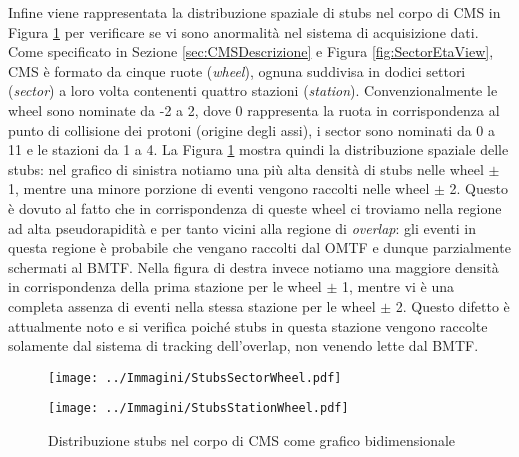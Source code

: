   Infine viene rappresentata la distribuzione spaziale di stubs nel corpo di CMS in Figura \ref{fig:StubsInCMS} per verificare se vi sono anormalità nel sistema di acquisizione dati. Come specificato in Sezione \ref{sec:CMSDescrizione} e Figura \ref{fig:SectorEtaView}, CMS è formato da cinque ruote (\textit{wheel}), ognuna suddivisa in dodici settori (\textit{sector}) a loro volta contenenti quattro stazioni (\textit{station}). Convenzionalmente le wheel sono nominate da -2 a 2, dove 0 rappresenta la ruota in corrispondenza al punto di collisione dei protoni (origine degli assi), i sector sono nominati da 0 a 11 e le stazioni da 1 a 4. La Figura \ref{fig:StubsInCMS} mostra quindi la distribuzione spaziale delle stubs: nel grafico di sinistra notiamo una più alta densità di stubs nelle wheel $\pm$ 1, mentre una minore porzione di eventi vengono raccolti nelle wheel $\pm$ 2. Questo è dovuto al fatto che in corrispondenza di queste wheel ci troviamo nella regione ad alta pseudorapidità e per tanto vicini alla regione di \textit{overlap}: gli eventi in questa regione è probabile che vengano raccolti dal OMTF e dunque parzialmente schermati al BMTF. Nella figura di destra invece notiamo una maggiore densità in corrispondenza della prima stazione per le wheel $\pm$ 1, mentre vi è una completa assenza di eventi nella stessa stazione per le wheel $\pm$ 2. Questo difetto è attualmente noto e si verifica poiché stubs in questa stazione vengono raccolte solamente dal sistema di tracking dell'overlap, non venendo lette dal BMTF.




  \begin{figure}[t]
    \centering
    \begin{minipage}[b]{0.49\textwidth}
        \centering
        \texttt{[image: ../Immagini/StubsSectorWheel.pdf]} 
      \end{minipage}
      \hfill 
      \begin{minipage}[b]{0.49\textwidth}
        \centering
        \texttt{[image: ../Immagini/StubsStationWheel.pdf]} 
      \end{minipage}
      \caption{Distribuzione stubs nel corpo di CMS come grafico bidimensionale}
    \label{fig:StubsInCMS}
  \end{figure}





